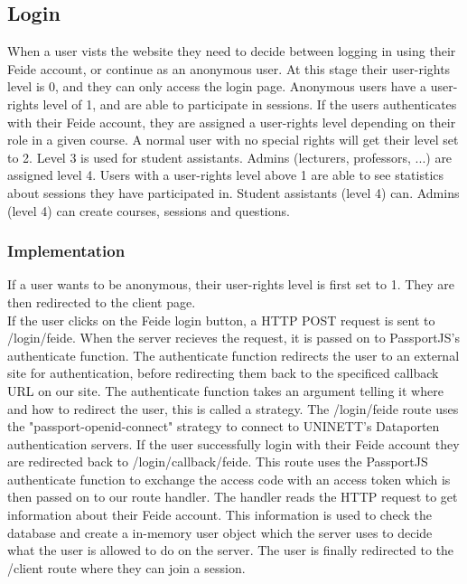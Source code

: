 \subsection{Login}
When a user vists the website they need to decide between logging in using their Feide account, or continue as an anonymous user. At this stage their user-rights level is 0, and they can only access the login page. Anonymous users have a user-rights level of 1, and are able to participate in sessions. If the users authenticates with their Feide account, they are assigned a user-rights level depending on their role in a given course. A normal user with no special rights will get their level set to 2. Level 3 is used for student assistants. Admins (lecturers, professors, ...) are assigned level 4. Users with a user-rights level above 1 are able to see statistics about sessions they have participated in. Student assistants (level 4) can.
Admins (level 4) can create courses, sessions and questions.
\subsubsection{Implementation}
If a user wants to be anonymous, their user-rights level is first set to 1. They are then redirected to the client page.
\\[11pt]
If the user clicks on the Feide login button, a HTTP POST request is sent to /login/feide. When the server recieves the request, it is passed on to PassportJS's authenticate function. The authenticate function redirects the user to an external site for authentication, before redirecting them back to the specificed callback URL on our site. The authenticate function takes an argument telling it where and how to redirect the user, this is called a strategy. The /login/feide route uses the "passport-openid-connect" strategy to connect to UNINETT's Dataporten authentication servers. If the user successfully login with their Feide account they are redirected back to /login/callback/feide. This route uses the PassportJS authenticate function to exchange the access code with an access token which is then passed on to our route handler. The handler reads the HTTP request to get information about their Feide account. This information is used to check the database and create a in-memory user object which the server uses to decide what the user is allowed to do on the server. The user is finally redirected to the /client route where they can join a session.